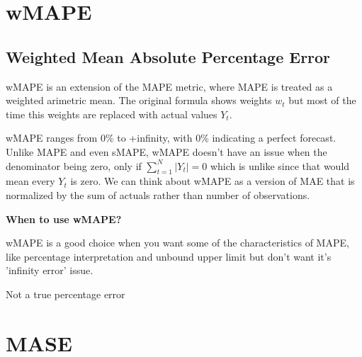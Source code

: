 \clearpage
\thispagestyle{regressionstyle}
\section{wMAPE}
\subsection{Weighted Mean Absolute Percentage Error}

wMAPE is an extension of the MAPE metric, where MAPE is treated as a weighted arimetric mean. The original formula shows weights $w_{t}$ but most of the time this weights are replaced
with actual values $Y_{t}$.

\begin{center}
\end{center}


wMAPE ranges from 0\% to +infinity, with 0\% indicating a perfect forecast. Unlike MAPE and even sMAPE, wMAPE doesn't have an issue when the denominator being zero,
only if $\sum_{t=1}^{N}|Y_{t}| = 0$ which is unlike since that would mean every $Y_{t}$ is zero. We can think about wMAPE as a version of MAE that is normalized by the sum of
actuals rather than number of observations.

\textbf{When to use wMAPE?}

wMAPE is a good choice when you want some of the characteristics of MAPE, like percentage interpretation and unbound upper limit but don't want it's 'infinity error' issue.

{
    \item Not a true percentage error
}

\clearpage
\thispagestyle{regressionstyle}
\section{MASE}
